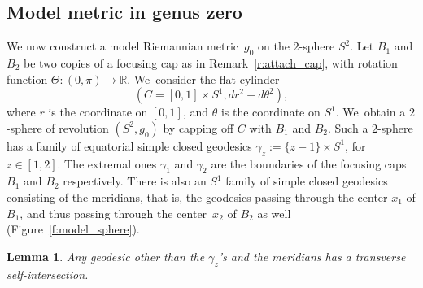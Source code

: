 \documentclass[JEP,XML,SOM,Unicode,NoFloatCountersInSection,published]{cedram}
\newcommand{\R}{\mathbb{R}}
\theoremstyle{plain}
\newtheorem{Lemma}[Thm]{Lemma}
\theoremstyle{definition}
\begin{document}
\subsection{Model metric in genus zero}
We now construct a model Riemannian metric~$g_0$ on the $2$-sphere $S^2$.
Let $B_1$ and $B_2$ be two copies of a focusing cap as in Remark~\ref{r:attach_cap}, with rotation function $\Theta:(0,\pi)\to\R$. We~consider the flat cylinder \[
(C=[0,1]\times S^1,dr^2+d\theta^2),
\]
where $r$ is the coordinate on $[0,1]$, and $\theta$ is the coordinate on $S^1$. We~obtain a $2$-sphere of revolution $(S^2,g_0)$ by capping off $C$ with $B_1$ and $B_2$.
Such a $2$-sphere has a family of equatorial simple closed geodesics $\gamma_z:=\{z-1\}\times S^1$, for $z\in[1,2]$. The extremal ones $\gamma_1$ and $\gamma_{2}$ are the boundaries of the focusing caps $B_1$ and $B_2$ respectively. There is also an $S^1$ family of simple closed geodesics consisting of the meridians, that is, the geodesics passing through the center $x_1$ of $B_1$, and thus passing through the center~$x_2$ of $B_2$ as well (Figure~\ref{f:model_sphere}).

\begin{Lemma}\label{l:only_meridians}
Any geodesic other than the $\gamma_z$'s and the meridians has a transverse self-intersection.
\end{Lemma}
\end{document}
